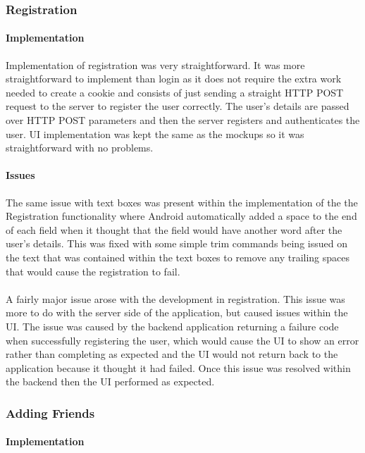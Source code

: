\subsubsection{Registration}

\paragraph*{Implementation}

Implementation of registration was very straightforward. It was more straightforward to implement than login as it does not require the extra work needed to create a cookie and consists of just sending a straight HTTP POST request to the server to register the user correctly. The user's details are passed over HTTP POST parameters and then the server registers and authenticates the user. UI implementation was kept the same as the mockups so it was straightforward with no problems.

\paragraph*{Issues}

The same issue with text boxes was present within the implementation of the the Registration functionality where Android automatically added a space to the end of each field when it thought that the field would have another word after the user's details. This was fixed with some simple trim commands being issued on the text that was contained within the text boxes to remove any trailing spaces that would cause the registration to fail.\\
\\
A fairly major issue arose with the development in registration. This issue was more to do with the server side of the application, but caused issues within the UI. The issue was caused by the backend application returning a failure code when successfully registering the user, which would cause the UI to show an error rather than completing as expected and the UI would not return back to the application because it thought it had failed. Once this issue was resolved within the backend then the UI performed as expected.


\subsubsection{Adding Friends}

\paragraph*{Implementation}

